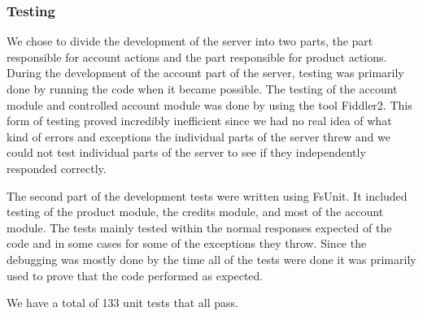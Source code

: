 \subsubsection{Testing}
We chose to divide the development of the server into two parts, the part responsible for account actions and the part responsible for product actions.  During the development of the account part of the server, testing was primarily done by running the code when it became possible. The testing of the account module and controlled account module  was done by using the tool Fiddler2. This form of testing proved incredibly inefficient since we had no real idea of what kind of errors and exceptions the individual parts of the server threw and we could not test individual parts of the server to see if they independently responded correctly.

The second part of the development tests were written using FsUnit. It included testing of the product module, the credits module, and most of the account module. The tests mainly tested within the normal responses expected of the code and in some cases for some of the exceptions they throw.  Since the debugging was mostly done by the time all of the tests were done it was primarily used to prove that the code performed as expected.

We have a total of 133 unit tests that all pass.